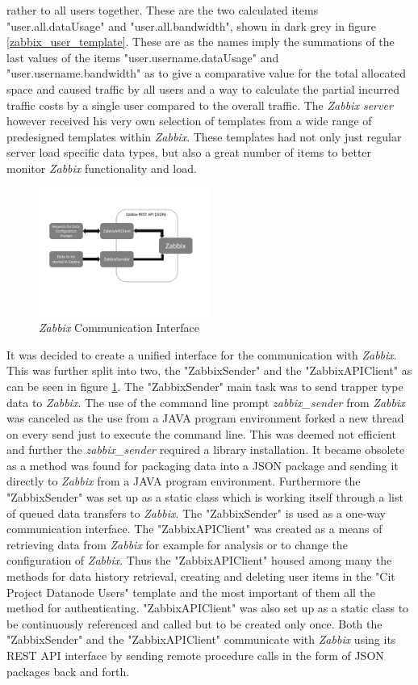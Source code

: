 rather to all users together. These are the two calculated items "user.all.dataUsage" and "user.all.bandwidth", shown in dark grey in figure \ref{zabbix_user_template}. These are as the names imply the summations of the last values of the items "user.username.dataUsage" and "user.username.bandwidth" as to give a comparative value for the total allocated space and caused traffic by all users and a  way to calculate the partial incurred traffic costs by a single user compared to the overall traffic.
	The \textit{Zabbix server} however received his very own selection of templates from a wide range of predesigned templates within \textit{Zabbix}. These templates had not only just regular server load specific data types, but also a great number of items to better monitor \textit{Zabbix} functionality and load.
\begin{figure}[ht]
\centering
\includegraphics[width=0.5\textwidth]{img/ZabbixApiSender} 

\caption{\textit{Zabbix} Communication Interface}
\label{zabbix_api_sender}
\end{figure}
	It was decided to create a unified interface for the communication with \textit{Zabbix}. This was further split into two, the "ZabbixSender" and the "ZabbixAPIClient" as can be seen in figure \ref{zabbix_api_sender}. The "ZabbixSender" main task was to send trapper type data to \textit{Zabbix}. The use of the command line prompt \textit{zabbix\_sender} from \textit{Zabbix} was canceled as the use from a JAVA program environment forked a new thread on every send just to execute the command line. This was deemed not efficient and further the \textit{zabbix\_sender} required a library installation. It became obsolete as a method was found for packaging data into a JSON package and sending it directly to \textit{Zabbix} from a JAVA program environment. Furthermore the "ZabbixSender" was set up as a static class which is working itself through a list of queued data transfers to \textit{Zabbix}. The "ZabbixSender" is used as a one-way communication interface. The "ZabbixAPIClient" was created as a means of retrieving data from \textit{Zabbix} for example for analysis or to change the configuration of \textit{Zabbix}. Thus the "ZabbixAPIClient" housed among many the methods for data history retrieval, creating and deleting user items in the "Cit Project Datanode Users" template and the most important of them all the method for authenticating. "ZabbixAPIClient" was also set up as a static class to be continuously referenced and called but to be created only once. Both the "ZabbixSender" and the "ZabbixAPIClient" communicate with \textit{Zabbix} using its REST API interface by sending remote procedure calls in the form of JSON packages back and forth.

